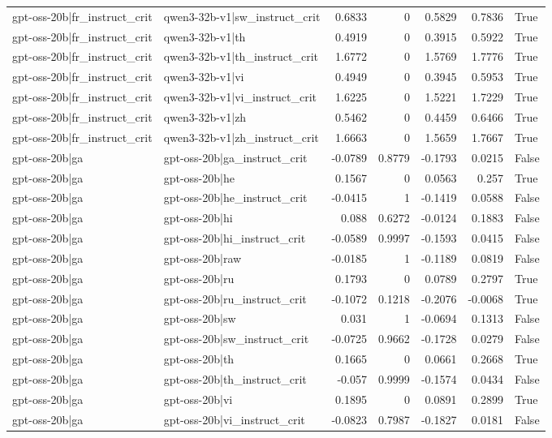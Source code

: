 \begin{table}
\begin{tabular}{l l r r r r l}
gpt-oss-20b|fr_instruct_crit & qwen3-32b-v1|sw_instruct_crit & 0.6833 & 0 & 0.5829 & 0.7836 & True \\
gpt-oss-20b|fr_instruct_crit & qwen3-32b-v1|th & 0.4919 & 0 & 0.3915 & 0.5922 & True \\
gpt-oss-20b|fr_instruct_crit & qwen3-32b-v1|th_instruct_crit & 1.6772 & 0 & 1.5769 & 1.7776 & True \\
gpt-oss-20b|fr_instruct_crit & qwen3-32b-v1|vi & 0.4949 & 0 & 0.3945 & 0.5953 & True \\
gpt-oss-20b|fr_instruct_crit & qwen3-32b-v1|vi_instruct_crit & 1.6225 & 0 & 1.5221 & 1.7229 & True \\
gpt-oss-20b|fr_instruct_crit & qwen3-32b-v1|zh & 0.5462 & 0 & 0.4459 & 0.6466 & True \\
gpt-oss-20b|fr_instruct_crit & qwen3-32b-v1|zh_instruct_crit & 1.6663 & 0 & 1.5659 & 1.7667 & True \\
gpt-oss-20b|ga & gpt-oss-20b|ga_instruct_crit & -0.0789 & 0.8779 & -0.1793 & 0.0215 & False \\
gpt-oss-20b|ga & gpt-oss-20b|he & 0.1567 & 0 & 0.0563 & 0.257 & True \\
gpt-oss-20b|ga & gpt-oss-20b|he_instruct_crit & -0.0415 & 1 & -0.1419 & 0.0588 & False \\
gpt-oss-20b|ga & gpt-oss-20b|hi & 0.088 & 0.6272 & -0.0124 & 0.1883 & False \\
gpt-oss-20b|ga & gpt-oss-20b|hi_instruct_crit & -0.0589 & 0.9997 & -0.1593 & 0.0415 & False \\
gpt-oss-20b|ga & gpt-oss-20b|raw & -0.0185 & 1 & -0.1189 & 0.0819 & False \\
gpt-oss-20b|ga & gpt-oss-20b|ru & 0.1793 & 0 & 0.0789 & 0.2797 & True \\
gpt-oss-20b|ga & gpt-oss-20b|ru_instruct_crit & -0.1072 & 0.1218 & -0.2076 & -0.0068 & True \\
gpt-oss-20b|ga & gpt-oss-20b|sw & 0.031 & 1 & -0.0694 & 0.1313 & False \\
gpt-oss-20b|ga & gpt-oss-20b|sw_instruct_crit & -0.0725 & 0.9662 & -0.1728 & 0.0279 & False \\
gpt-oss-20b|ga & gpt-oss-20b|th & 0.1665 & 0 & 0.0661 & 0.2668 & True \\
gpt-oss-20b|ga & gpt-oss-20b|th_instruct_crit & -0.057 & 0.9999 & -0.1574 & 0.0434 & False \\
gpt-oss-20b|ga & gpt-oss-20b|vi & 0.1895 & 0 & 0.0891 & 0.2899 & True \\
gpt-oss-20b|ga & gpt-oss-20b|vi_instruct_crit & -0.0823 & 0.7987 & -0.1827 & 0.0181 & False \\

\end{tabular}
\end{table}
